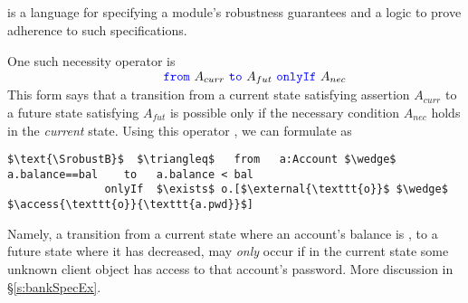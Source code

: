 \vspace{.04in}

\subsection{\Nec}
\label{intro:this:work}
\Nec is a language for specifying a module's robustness guarantees 
and a logic 
to prove adherence to such specifications.

%
%
%  
 One such necessity operator is \\
$ 
\strut \hspace{1.7in} {\color{blue}\texttt{from}}\ A_{curr}\ {\color{blue}\texttt{to}}\ A_{fut}\ {\color{blue}\texttt{onlyIf}}\ A_{nec}
$  
\\
This form says that  
a  {transition} from a current state satisfying assertion $A_{curr}$ to a future
state satisfying $A_{fut}$  is possible only if  the   necessary 
condition
$A_{nec}$ holds in the \emph{current} state.
Using this operator 
, 
we can formulate  \SrobustB  
as
\begin{lstlisting}[language = Chainmail, mathescape=true, frame=lines]
   $\text{\SrobustB}$  $\triangleq$   from   a:Account $\wedge$ a.balance==bal    to   a.balance < bal
               onlyIf  $\exists$ o.[$\external{\texttt{o}}$ $\wedge$ $\access{\texttt{o}}{\texttt{a.pwd}}$]
\end{lstlisting}
Namely, a transition from a  {current} state where an account's balance is , to a  {future} state where 
it has decreased, may \emph{only} occur if  {in the current state} some unknown client object  
has access to that account's password. 
More discussion in \S\ref{s:bankSpecEx}. 


